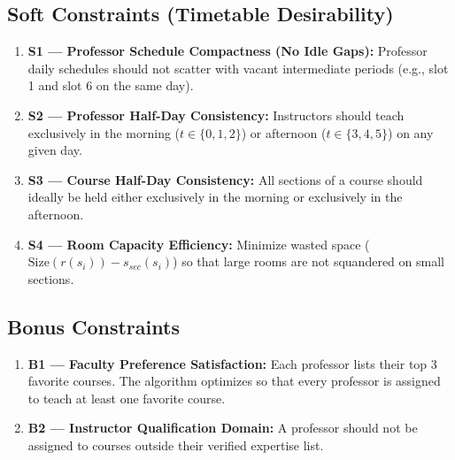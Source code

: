\subsection{Soft Constraints (Timetable Desirability)}
\begin{enumerate}[leftmargin=2.0em]
  \item \textbf{S1 --- Professor Schedule Compactness (No Idle Gaps):}
  Professor daily schedules should not scatter with vacant intermediate periods (e.g., slot 1 and slot 6 on the same day).
  \item \textbf{S2 --- Professor Half-Day Consistency:}
  Instructors should teach exclusively in the morning ($t \in \{0, 1, 2\}$) or afternoon ($t \in \{3, 4, 5\}$) on any given day.
  \item \textbf{S3 --- Course Half-Day Consistency:}
  All sections of a course should ideally be held either exclusively in the morning or exclusively in the afternoon.
  \item \textbf{S4 --- Room Capacity Efficiency:}
  Minimize wasted space ($\text{Size}(r(s_i)) - s_{sec}(s_i)$) so that large rooms are not squandered on small sections.
\end{enumerate}

\subsection{Bonus Constraints}
\begin{enumerate}[leftmargin=2.0em]
  \item \textbf{B1 --- Faculty Preference Satisfaction:}
  Each professor lists their top 3 favorite courses. The algorithm optimizes so that every professor is assigned to teach at least one favorite course.
  \item \textbf{B2 --- Instructor Qualification Domain:}
  A professor should not be assigned to courses outside their verified expertise list.
\end{enumerate}
